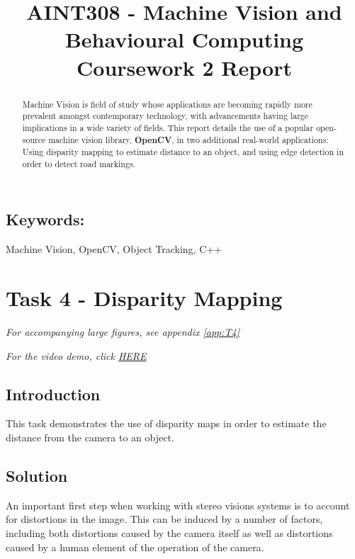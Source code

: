 \documentclass[conference]{IEEEtran}
\begin{document}
%
\title{AINT308 - Machine Vision and Behavioural Computing\\Coursework 2 Report}


\author{
}



\maketitle


\begin{abstract}
 Machine Vision is field of study whose applications are becoming rapidly more prevalent amongst contemporary technology, with advancements having large implications in a wide variety of fields. This report details the use of a popular open-source machine vision library, \textbf{OpenCV}, in two additional real-world applications: Using disparity mapping to estimate distance to an object, and using edge detection in order to detect road markings.
\end{abstract}
\subsection*{Keywords:}
Machine Vision, OpenCV, Object Tracking, C++

\section{Task 4 - Disparity Mapping}
\textit{For accompanying large figures, see appendix \ref{app:T4}}

\textit{For the video demo, click \href{https://youtu.be/kQwU62_2fdQ}{HERE}}
\subsection{Introduction}
This task demonstrates the use of disparity maps in order to estimate the distance from the camera to an object.
\subsection{Solution}
An important first step when working with stereo visions systems is to account for distortions in the image. This can be induced by a number of factors, including both distortions caused by the camera itself as well as distortions caused by a human element of the operation of the camera\cite{Distortions}.
\end{document}
